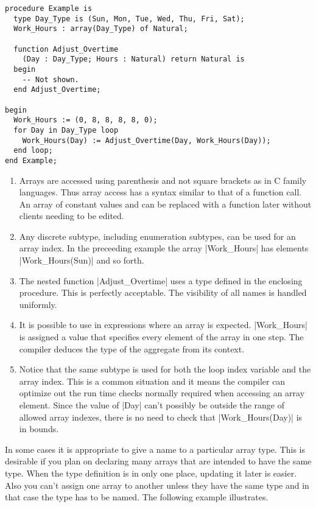 \begin{lstlisting}
procedure Example is
  type Day_Type is (Sun, Mon, Tue, Wed, Thu, Fri, Sat);
  Work_Hours : array(Day_Type) of Natural;

  function Adjust_Overtime
    (Day : Day_Type; Hours : Natural) return Natural is
  begin
    -- Not shown.
  end Adjust_Overtime;

begin
  Work_Hours := (0, 8, 8, 8, 8, 0);
  for Day in Day_Type loop
    Work_Hours(Day) := Adjust_Overtime(Day, Work_Hours(Day));
  end loop;
end Example;
\end{lstlisting}

\begin{enumerate}

\item Arrays are accessed using parenthesis and not square brackets as in C family languages.
  Thus array access has a syntax similar to that of a function call. An array of constant values
  and can be replaced with a function later without clients needing to be edited.

\item Any discrete subtype, including enumeration subtypes, can be used for an array index. In
  the preceeding example the array |Work_Hours| has elements |Work_Hours(Sun)| and so forth.

\item The nested function |Adjust_Overtime| uses a type defined in the enclosing procedure. This
  is perfectly acceptable. The visibility of all names is handled uniformly.

\item It is possible to use  in expressions where an array is
  expected. |Work_Hours| is assigned a value that specifies every element of the array in one
  step. The compiler deduces the type of the aggregate from its context.

\item Notice that the same subtype is used for both the loop index variable and the array index.
  This is a common situation and it means the compiler can optimize out the run time checks
  normally required when accessing an array element. Since the value of |Day| can't possibly be
  outside the range of allowed array indexes, there is no need to check that |Work_Hours(Day)|
  is in bounds.

\end{enumerate}

In some cases it is appropriate to give a name to a particular array type. This is desirable if
you plan on declaring many arrays that are intended to have the same type. When the type
definition is in only one place, updating it later is easier. Also you can't assign one array to
another unless they have the same type and in that case the type has to be named. The following
example illustrates.

